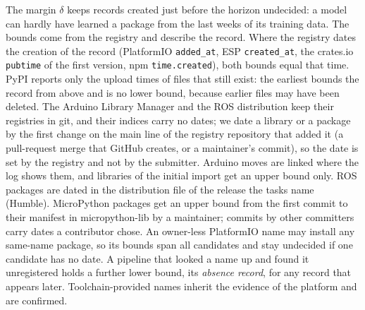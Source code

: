 \documentclass[conference]{IEEEtran}
\begin{document}
The margin $\delta$ keeps records created just before the horizon undecided: a model can hardly have learned a
package from the last weeks of its training data. The bounds come from the registry and describe the record. Where the
registry dates the creation of the record (PlatformIO \texttt{added\_at}, ESP \texttt{created\_at}, the crates.io
\texttt{pubtime} of the first version, npm \texttt{time.created}), both bounds equal that time. PyPI reports only the
upload times of files that still exist: the earliest bounds the record from above and is no lower bound, because
earlier files may have been deleted. The Arduino Library Manager and the ROS distribution keep their registries in git,
and their indices carry no dates; we date a library or a package by the first change on the main line of the registry
repository that added it (a pull-request merge that GitHub creates, or a maintainer's commit), so the date is set by the
registry and not by the submitter. Arduino moves are linked where the log shows them, and libraries of the initial
import get an upper bound only. ROS packages are dated in the distribution file of the release the tasks name
(Humble). MicroPython packages get an upper bound from the first commit to their manifest in micropython-lib by a
maintainer; commits by other committers carry dates a contributor chose. An owner-less PlatformIO name may install
any same-name package, so its bounds span all candidates and stay undecided if one candidate has no date. A pipeline
that looked a name up and found it unregistered holds a further lower bound, its \emph{absence record}, for any record
that appears later. Toolchain-provided names inherit the evidence of the platform and are confirmed.
\end{document}
